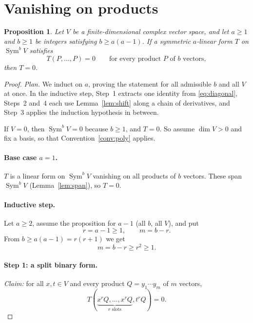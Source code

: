 \documentclass[11pt]{article}
\newtheorem{proposition}[theorem]{Proposition}
\theoremstyle{definition}
\theoremstyle{remark}
\DeclareMathOperator{\Sym}{Sym}
\begin{document}
\section{Vanishing on products}\label{sec:vanishing}

\begin{proposition}\label{prop:vanishing}
Let $V$ be a finite-dimensional complex vector space, and let $a\ge1$ and
$b\ge1$ be integers satisfying $b\ge a(a-1)$.
If a symmetric $a$-linear form $T$ on $\Sym^b V$ satisfies
\begin{equation}\label{eq:diagonal}
 T(P,\ldots,P)=0
 \qquad\text{for every product $P$ of $b$ vectors},
\end{equation}
then $T=0$.
\end{proposition}

\begin{proof}
\emph{Plan.} We induct on $a$, proving the statement for all admissible $b$
and all $V$ at once. In the inductive step, Step~1 extracts one identity
from \eqref{eq:diagonal}, Steps~2 and~4 each use Lemma~\ref{lem:shift} along
a chain of derivatives, and Step~3 applies the induction hypothesis in
between.

If $V=0$, then $\Sym^bV=0$ because $b\ge1$, and $T=0$. So assume
$\dim V>0$ and fix a basis, so that Convention~\ref{conv:poly} applies.

\paragraph{Base case $a=1$.}
$T$ is a linear form on $\Sym^bV$ vanishing on all products of $b$ vectors.
These span $\Sym^bV$ (Lemma~\ref{lem:span}), so $T=0$.

\paragraph{Inductive step.}
Let $a\ge2$, assume the proposition for $a-1$ (all $b$, all $V$), and put
\begin{equation}\label{eq:rm}
 r=a-1\ge1,\qquad m=b-r.
\end{equation}
From $b\ge a(a-1)=r(r+1)$ we get
\begin{equation}\label{eq:range}
 m=b-r\ge r^2\ge1 .
\end{equation}

\paragraph{Step 1: a split binary form.}
\emph{Claim:} for all $x,t\in V$ and every product $Q=y_1\cdots y_m$ of $m$
vectors,
\begin{equation}\label{eq:binary}
 T(\underbrace{x^rQ,\ldots,x^rQ}_{r\text{ slots}},t^rQ)=0.
\end{equation}


\end{proof}
\end{document}
